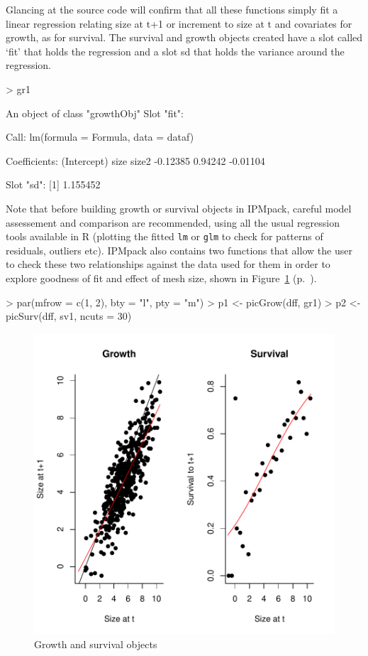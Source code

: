 \documentclass{article}
\begin{document}
Glancing at the source code will confirm that all these functions simply fit a linear regression relating size at t+1 or increment to size at t and covariates for growth, as for survival. The survival and growth objects created have a slot called `fit' that holds the regression and a slot sd that holds the variance around the regression. 
\begin{Schunk}
\begin{Sinput}
> gr1
\end{Sinput}
\begin{Soutput}
An object of class "growthObj"
Slot "fit":

Call:
lm(formula = Formula, data = dataf)

Coefficients:
(Intercept)         size        size2  
   -0.12385      0.94242     -0.01104  


Slot "sd":
[1] 1.155452
\end{Soutput}
\end{Schunk}
Note that before building growth or survival objects in IPMpack, careful model assessement and comparison are recommended, using all the usual regression tools available in R (plotting the fitted {\tt lm} or {\tt glm} to check for patterns of residuals, outliers etc). IPMpack also contains two functions that allow the user to check these two relationships against the data used for them in order to explore goodness of fit and effect of mesh size, shown in Figure~\ref{fig:one} (p.~\pageref{fig:one}).
\begin{Schunk}
\begin{Sinput}
> par(mfrow = c(1, 2), bty = "l", pty = "m")
> p1 <- picGrow(dff, gr1)
> p2 <- picSurv(dff, sv1, ncuts = 30)
\end{Sinput}
\end{Schunk}
\begin{figure}
\begin{center}
\includegraphics{IPMpack_Vignette-fig1}
\end{center}
\caption{Growth and survival objects}
\label{fig:one}
\end{figure}
\end{document}
